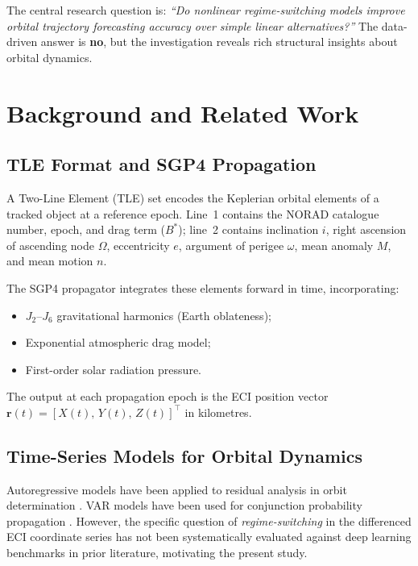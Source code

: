\documentclass[conference]{IEEEtran}
\begin{document}
The central research question is: \emph{``Do nonlinear regime-switching models
improve orbital trajectory forecasting accuracy over simple linear
alternatives?''} The data-driven answer is \textbf{no}, but the investigation
reveals rich structural insights about orbital dynamics.

\section{Background and Related Work}
\label{sec:background}

\subsection{TLE Format and SGP4 Propagation}

A Two-Line Element (TLE) set \cite{hoots1980} encodes the Keplerian orbital
elements of a tracked object at a reference epoch. Line~1 contains the NORAD
catalogue number, epoch, and drag term ($B^*$); line~2 contains inclination
$i$, right ascension of ascending node $\Omega$, eccentricity $e$, argument
of perigee $\omega$, mean anomaly $M$, and mean motion $n$.

The SGP4 propagator \cite{hoots1980} integrates these elements forward in
time, incorporating:
\begin{itemize}
  \item $J_2$--$J_6$ gravitational harmonics (Earth oblateness);
  \item Exponential atmospheric drag model;
  \item First-order solar radiation pressure.
\end{itemize}
The output at each propagation epoch is the ECI position vector
$\mathbf{r}(t) = [X(t),\, Y(t),\, Z(t)]^\top$ in kilometres.

\subsection{Time-Series Models for Orbital Dynamics}

Autoregressive models have been applied to residual analysis in orbit
determination \cite{vallado2013}. VAR models have been used for conjunction
probability propagation \cite{alfriend2000}. However, the specific question
of \emph{regime-switching} in the differenced ECI coordinate series has not
been systematically evaluated against deep learning benchmarks in prior
literature, motivating the present study.
\end{document}
